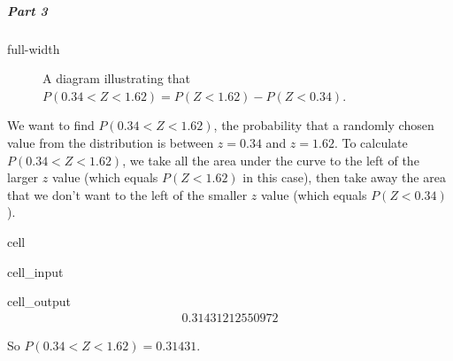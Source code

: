 \documentclass[letterpaper,10pt,english]{jupyterBook}
\begin{document}
\subparagraph{Part 3}
\label{\detokenize{Ch4 The Normal Distribution and the Central Limit Theorem/4.2 The Standard Normal Distribution:id5}}
\begin{sphinxuseclass}{full-width}
\begin{figure}[htbp]
\centering
\capstart

\noindent{}
\caption{A diagram illustrating that \(P(0.34 < Z < 1.62) = P(Z < 1.62) - P(Z < 0.34)\).}\label{\detokenize{Ch4 The Normal Distribution and the Central Limit Theorem/4.2 The Standard Normal Distribution:stdnormals-between-eqn2}}\end{figure}

\end{sphinxuseclass}
\sphinxAtStartPar
We want to find \(P(0.34 < Z < 1.62)\), the probability that a randomly chosen value from the distribution is between \(z = 0.34\) and \(z = 1.62\). To calculate \(P(0.34 < Z < 1.62)\), we take all the area under the curve to the left of the larger \(z\) value (which equals \(P(Z < 1.62)\) in this case), then take away the area that we don’t want to the left of the smaller \(z\) value (which equals \(P(Z < 0.34)\)).

\begin{sphinxuseclass}{cell}\begin{sphinxVerbatimInput}

\begin{sphinxuseclass}{cell_input}
\begin{sphinxVerbatim}[commandchars=\\\{\}]
\end{sphinxVerbatim}

\end{sphinxuseclass}\end{sphinxVerbatimInput}
\begin{sphinxVerbatimOutput}

\begin{sphinxuseclass}{cell_output}\begin{equation*}
\begin{split}0.31431212550972\end{split}
\end{equation*}
\end{sphinxuseclass}\end{sphinxVerbatimOutput}

\end{sphinxuseclass}
\sphinxAtStartPar
So \(P(0.34 < Z < 1.62) = 0.31431\).
\end{document}
